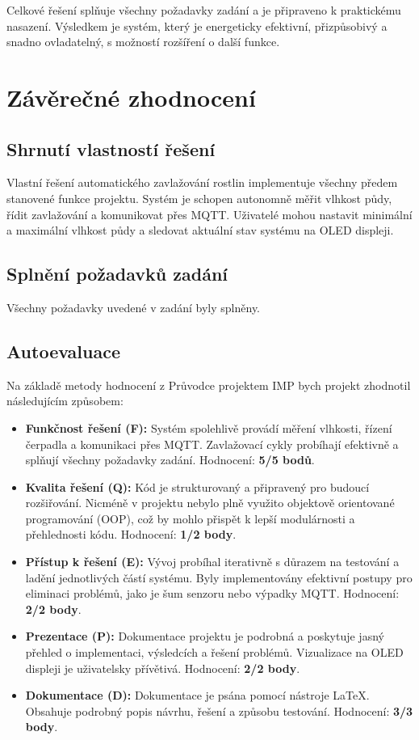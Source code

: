 \documentclass[a4paper, 11pt]{article}
\begin{document}
Celkové řešení splňuje všechny požadavky zadání a je připraveno k praktickému nasazení. Výsledkem je systém, který je energeticky efektivní, 
přizpůsobivý a snadno ovladatelný, s možností rozšíření o další funkce.

\section{Závěrečné zhodnocení}

\subsection{Shrnutí vlastností řešení}

Vlastní řešení automatického zavlažování rostlin implementuje všechny předem stanovené funkce projektu. 
Systém je schopen autonomně měřit vlhkost půdy, řídit zavlažování a komunikovat přes MQTT. 
Uživatelé mohou nastavit minimální a maximální vlhkost půdy a sledovat aktuální stav systému na OLED displeji.

\subsection{Splnění požadavků zadání}

Všechny požadavky uvedené v zadání byly splněny.

\subsection{Autoevaluace}

Na základě metody hodnocení z Průvodce projektem IMP bych projekt zhodnotil následujícím způsobem:
\begin{itemize}
    \item \textbf{Funkčnost řešení (F):} Systém spolehlivě provádí měření vlhkosti, řízení čerpadla a komunikaci přes MQTT. Zavlažovací cykly probíhají efektivně a splňují všechny požadavky zadání. Hodnocení: \textbf{5/5 bodů}.
    \item \textbf{Kvalita řešení (Q):} Kód je strukturovaný a připravený pro budoucí rozšiřování. Nicméně v projektu nebylo plně využito objektově orientované programování (OOP), což by mohlo přispět k lepší modulárnosti a přehlednosti kódu. Hodnocení: \textbf{1/2 body}.    \item \textbf{Přístup k řešení (E):} Vývoj probíhal iterativně s důrazem na testování a ladění jednotlivých částí systému. Byly implementovány efektivní postupy pro eliminaci problémů, jako je šum senzoru nebo výpadky MQTT. Hodnocení: \textbf{2/2 body}.
    \item \textbf{Prezentace (P):} Dokumentace projektu je podrobná a poskytuje jasný přehled o implementaci, výsledcích a řešení problémů. Vizualizace na OLED displeji je uživatelsky přívětivá. Hodnocení: \textbf{2/2 body}.
    \item \textbf{Dokumentace (D):} Dokumentace je psána pomocí nástroje \LaTeX. Obsahuje podrobný popis návrhu, řešení a způsobu testování. Hodnocení: \textbf{3/3 body}.
\end{itemize}
\end{document}
